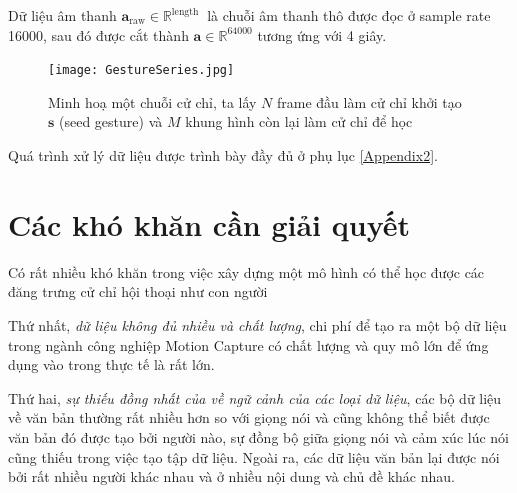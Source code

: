 Dữ liệu âm thanh $\mathbf{a}_{\text{raw}} \in \mathbb{R}^{ \text{length } }$ là chuỗi âm thanh thô được đọc ở sample rate 16000, sau đó được cắt thành $\mathbf{a} \in \mathbb{R}^{64000}$ tương ứng với 4 giây.
\setcounter{figure}{2}
\begin{figure}[H]
	\centering
	\texttt{[image: GestureSeries.jpg]}
	\caption{Minh hoạ một chuỗi cử chỉ, ta lấy $N$ frame đầu làm cử chỉ khởi tạo $\mathbf{s}$ (seed gesture) và $M$ khung hình còn lại làm cử chỉ để học}
	\label{fig:GestureSeries}
\end{figure}


Quá trình xử lý dữ liệu được trình bày đầy đủ ở phụ lục \ref{Appendix2}.





\section{Các khó khăn cần giải quyết}

Có rất nhiều khó khăn trong việc xây dựng một mô hình có thể học được các đăng trưng cử chỉ hội thoại như con người 

Thứ nhất, \textit{dữ liệu không đủ nhiều và chất lượng}, chi phí để tạo ra một bộ dữ liệu trong ngành công nghiệp Motion Capture có chất lượng và quy mô lớn để ứng dụng vào trong thực tế là rất lớn.

Thứ hai, \textit{sự thiếu đồng nhất của về ngữ cảnh của các loại dữ liệu}, các bộ dữ liệu về văn bản thường rất nhiều hơn so với giọng nói và cũng không thể biết được văn bản đó được tạo bởi người nào, sự đồng bộ giữa giọng nói và cảm xúc lúc nói cũng thiếu trong việc tạo tập dữ liệu. Ngoài ra, các dữ liệu văn bản lại được nói bởi rất nhiều người khác nhau và ở nhiều nội dung và chủ đề khác nhau.
 
